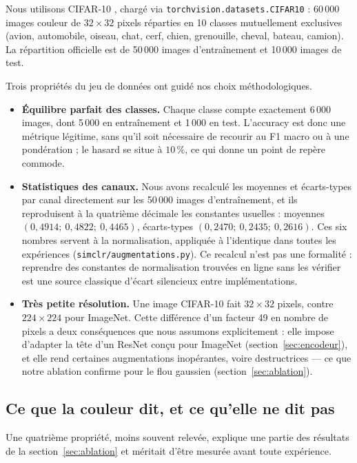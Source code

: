 \documentclass[11pt,a4paper]{article}
\begin{document}
Nous utilisons CIFAR-10 \cite{krizhevsky2009cifar}, chargé via
\texttt{torchvision.datasets.CIFAR10} : 60\,000 images couleur de $32\times32$ pixels
réparties en 10 classes mutuellement exclusives (avion, automobile, oiseau, chat, cerf,
chien, grenouille, cheval, bateau, camion). La répartition officielle est de 50\,000 images
d'entraînement et 10\,000 images de test.

Trois propriétés du jeu de données ont guidé nos choix méthodologiques.

\begin{itemize}
\item \textbf{Équilibre parfait des classes.} Chaque classe compte exactement 6\,000
images, dont 5\,000 en entraînement et 1\,000 en test. L'accuracy est donc une métrique
légitime, sans qu'il soit nécessaire de recourir au F1 macro ou à une pondération ; le
hasard se situe à $10\,\%$, ce qui donne un point de repère commode.
\item \textbf{Statistiques des canaux.} Nous avons recalculé les moyennes et écarts-types
par canal directement sur les 50\,000 images d'entraînement, et ils reproduisent à la
quatrième décimale les constantes usuelles : moyennes $(0{,}4914;\ 0{,}4822;\ 0{,}4465)$,
écarts-types $(0{,}2470;\ 0{,}2435;\ 0{,}2616)$. Ces six nombres servent à la normalisation,
appliquée à l'identique dans toutes les expériences (\texttt{simclr/augmentations.py}). Ce
recalcul n'est pas une formalité : reprendre des constantes de normalisation trouvées en
ligne sans les vérifier est une source classique d'écart silencieux entre implémentations.
\item \textbf{Très petite résolution.} Une image CIFAR-10 fait $32\times32$ pixels, contre
$224\times224$ pour ImageNet. Cette différence d'un facteur 49 en nombre de pixels a deux
conséquences que nous assumons explicitement : elle impose d'adapter la tête d'un ResNet
conçu pour ImageNet (section~\ref{sec:encodeur}), et elle rend certaines augmentations
inopérantes, voire destructrices --- ce que notre ablation confirme pour le flou gaussien
(section~\ref{sec:ablation}).
\end{itemize}

\subsection{Ce que la couleur dit, et ce qu'elle ne dit pas}
\label{sec:eda-couleur}

Une quatrième propriété, moins souvent relevée, explique une partie des résultats de la
section~\ref{sec:ablation} et méritait d'être mesurée avant toute expérience.
\end{document}
